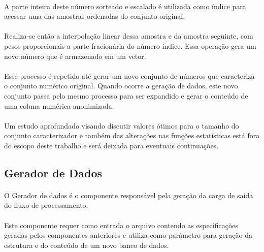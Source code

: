 \paragraph{} A parte inteira deste número sorteado e escalado é utilizada como índice para acessar uma das amostras ordenadas do conjunto original.

\paragraph{} Realiza-se então a interpolação linear dessa amostra e da amostra seguinte, com pesos proporcionais a parte fracionária do número índice. Essa operação gera um novo número que é armazenado em um vetor.

\paragraph{} Esse processo é repetido até gerar um novo conjunto de números que caracteriza o conjunto numérico original. Quando ocorre a geração de dados, este novo conjunto passa pelo mesmo processo para ser expandido e gerar o conteúdo de uma coluna numérica anonimizada.

\paragraph{} Um estudo aprofundado visando discutir valores ótimos para o tamanho do conjunto caracterizador e também das alterações nas funções estatísticas está fora do escopo deste trabalho e será deixada para eventuais continuações.

\subsection{Gerador de Dados}

\paragraph{} O Gerador de dados é o componente responsável pela geração da carga de saída do fluxo de processamento.

\paragraph{} Este componente requer como entrada o arquivo contendo as especificações geradas pelos componentes anteriores e utiliza como parâmetro para geração da estrutura e do conteúdo de um novo banco de dados.

